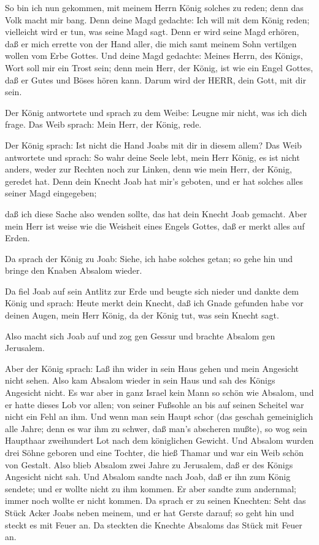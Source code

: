  So bin ich nun gekommen, mit meinem Herrn König solches zu
reden; denn das Volk macht mir bang. Denn deine Magd gedachte: Ich will
mit dem König reden; vielleicht wird er tun, was seine Magd sagt.
 Denn er wird seine Magd erhören, daß er mich errette von
der Hand aller, die mich samt meinem Sohn vertilgen wollen vom Erbe
Gottes.  Und deine Magd gedachte: Meines Herrn, des Königs,
Wort soll mir ein Trost sein; denn mein Herr, der König, ist wie ein
Engel Gottes, daß er Gutes und Böses hören kann. Darum wird der HERR,
dein Gott, mit dir sein.

 Der König antwortete und sprach zu dem Weibe: Leugne mir
nicht, was ich dich frage. Das Weib sprach: Mein Herr, der König, rede.

 Der König sprach: Ist nicht die Hand Joabs mit dir in
diesem allem? Das Weib antwortete und sprach: So wahr deine Seele lebt,
mein Herr König, es ist nicht anders, weder zur Rechten noch zur Linken,
denn wie mein Herr, der König, geredet hat. Denn dein Knecht Joab hat
mir's geboten, und er hat solches alles seiner Magd eingegeben;

 daß ich diese Sache also wenden sollte, das hat dein
Knecht Joab gemacht. Aber mein Herr ist weise wie die Weisheit eines
Engels Gottes, daß er merkt alles auf Erden.

 Da sprach der König zu Joab: Siehe, ich habe solches
getan; so gehe hin und bringe den Knaben Absalom wieder.

 Da fiel Joab auf sein Antlitz zur Erde und beugte sich
nieder und dankte dem König und sprach: Heute merkt dein Knecht, daß ich
Gnade gefunden habe vor deinen Augen, mein Herr König, da der König tut,
was sein Knecht sagt.

 Also macht sich Joab auf und zog gen Gessur und brachte
Absalom gen Jerusalem.

 Aber der König sprach: Laß ihn wider in sein Haus gehen
und mein Angesicht nicht sehen. Also kam Absalom wieder in sein Haus und
sah des Königs Angesicht nicht.  Es war aber in ganz Israel
kein Mann so schön wie Absalom, und er hatte dieses Lob vor allen; von
seiner Fußsohle an bis auf seinen Scheitel war nicht ein Fehl an ihm.
 Und wenn man sein Haupt schor (das geschah gemeiniglich
alle Jahre; denn es war ihm zu schwer, daß man's abscheren mußte), so
wog sein Haupthaar zweihundert Lot nach dem königlichen Gewicht.
 Und Absalom wurden drei Söhne geboren und eine Tochter,
die hieß Thamar und war ein Weib schön von Gestalt.  Also
blieb Absalom zwei Jahre zu Jerusalem, daß er des Königs Angesicht nicht
sah.  Und Absalom sandte nach Joab, daß er ihn zum König
sendete; und er wollte nicht zu ihm kommen. Er aber sandte zum
andernmal; immer noch wollte er nicht kommen.  Da sprach er
zu seinen Knechten: Seht das Stück Acker Joabs neben meinem, und er hat
Gerste darauf; so geht hin und steckt es mit Feuer an. Da steckten die
Knechte Absaloms das Stück mit Feuer an.

